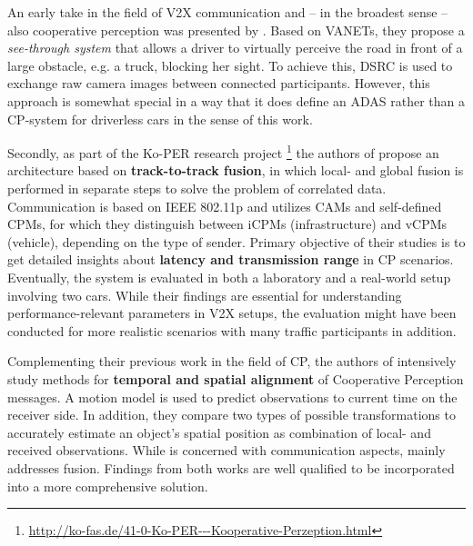 An early take in the field of V2X communication and – in the broadest sense – also cooperative perception was presented by \cite{Olaverri-Monreal2010}. Based on VANETs, they propose a \textit{see-through system} that allows a driver to virtually perceive the road in front of a large obstacle, e.g. a truck, blocking her sight. To achieve this, DSRC is used to exchange raw camera images between connected participants. However, this approach is somewhat special in a way that it does define an ADAS rather than a CP-system for driverless cars in the sense of this work.
\par
\bigskip

Secondly, as part of the Ko-PER research project \footnote{\url{http://ko-fas.de/41-0-Ko-PER---Kooperative-Perzeption.html}} the authors of \cite{Rauch2011} propose an architecture based on \textbf{track-to-track fusion}, in which local- and global fusion is performed in separate steps to solve the problem of correlated data. Communication is based on IEEE 802.11p and utilizes CAMs and self-defined CPMs, for which they distinguish between iCPMs (infrastructure) and vCPMs (vehicle), depending on the type of sender. Primary objective of their studies is to get detailed insights about \textbf{latency and transmission range} in CP scenarios. Eventually, the system is evaluated in both a laboratory and a real-world setup involving two cars. While their findings are essential for understanding performance-relevant parameters in V2X setups, the evaluation might have been conducted for more realistic scenarios with many traffic participants in addition.
\par
\bigskip

Complementing their previous work in the field of CP, the authors of \cite{Rauch2012} intensively study methods for \textbf{temporal and spatial alignment} of Cooperative Perception messages. A motion model is used to predict observations to current time on the receiver side. In addition, they compare two types of possible transformations to accurately estimate an object's spatial position as combination of local- and received observations. While \cite{Rauch2011} is concerned with communication aspects, \cite{Rauch2012} mainly addresses fusion. Findings from both works are well qualified to be incorporated into a more comprehensive solution. 
\par
\bigskip

